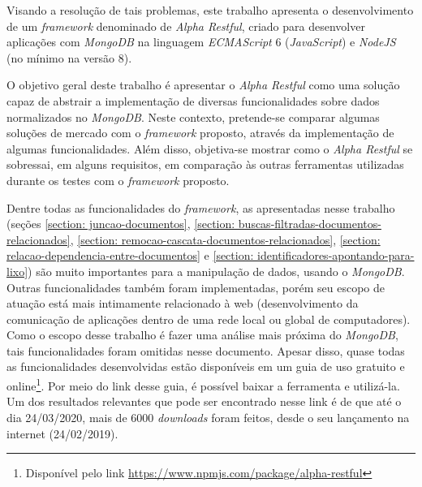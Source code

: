 Visando a resolução de tais problemas, este trabalho apresenta o desenvolvimento de um \textit{framework} denominado de \textit{Alpha Restful}, criado para desenvolver aplicações com \textit{MongoDB} na linguagem \textit{ECMAScript} 6 (\textit{JavaScript}) e \textit{NodeJS} (no mínimo na versão 8).


O objetivo geral deste trabalho é apresentar o \textit{Alpha Restful} como uma solução capaz de abstrair a implementação de diversas funcionalidades sobre dados normalizados no \textit{MongoDB}. Neste contexto, pretende-se comparar algumas soluções de mercado com o \textit{framework} proposto, através da implementação de algumas funcionalidades. Além disso, objetiva-se mostrar como o \textit{Alpha Restful}
se sobressai, em alguns requisitos, em comparação às outras ferramentas utilizadas durante os testes com o \textit{framework} proposto.

Dentre todas as funcionalidades do \textit{framework}, as apresentadas nesse trabalho (seções \ref{section: juncao-documentos}, \ref{section: buscas-filtradas-documentos-relacionados}, \ref{section: remocao-cascata-documentos-relacionados}, \ref{section: relacao-dependencia-entre-documentos} e \ref{section: identificadores-apontando-para-lixo}) são muito importantes para a manipulação de dados, usando o \textit{MongoDB}. Outras funcionalidades também foram implementadas, porém seu escopo de atuação está mais intimamente relacionado à web (desenvolvimento da comunicação de aplicações dentro de uma rede local ou global de computadores). Como o escopo desse trabalho é fazer uma análise mais próxima do \textit{MongoDB}, tais funcionalidades foram omitidas nesse documento. Apesar disso, quase todas as funcionalidades desenvolvidas estão disponíveis em um guia de uso gratuito e online\footnote{Disponível pelo link \url{https://www.npmjs.com/package/alpha-restful}}. Por meio do link desse guia, é possível baixar a ferramenta e utilizá-la. Um dos resultados relevantes que pode ser encontrado nesse link é de que até o dia 24/03/2020, mais de 6000 \textit{downloads} foram feitos, desde o seu lançamento na internet (24/02/2019).


